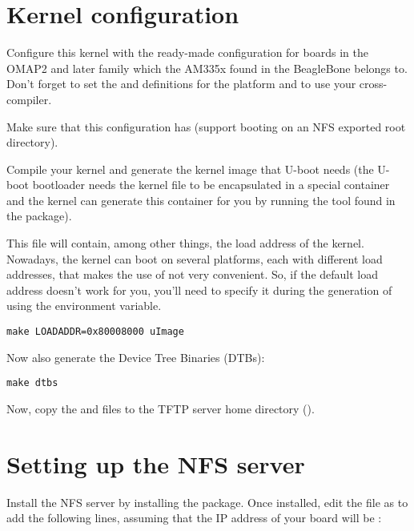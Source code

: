 \section{Kernel configuration}

Configure this kernel with the ready-made configuration for boards in
the OMAP2 and later family which the AM335x found in the BeagleBone
belongs to. Don't forget to set the  and
 definitions for the  platform and to
use your cross-compiler.

Make sure that this configuration has  (support
booting on an NFS exported root directory).

Compile your kernel and generate the  kernel image that
U-boot needs (the U-boot bootloader needs the kernel 
file to be encapsulated in a special container and the kernel
 can generate this container for you by running the
 tool found in the  package).

This file will contain, among other things, the load address of the
kernel. Nowadays, the kernel can boot on several platforms, each with
different load addresses, that makes the use of  not very
convenient. So, if the default load address doesn't work for you, you'll
need to specify it during the generation of  using the
 environment variable.

\begin{verbatim}
make LOADADDR=0x80008000 uImage
\end{verbatim}

Now also generate the Device Tree Binaries (DTBs):

\begin{verbatim}
make dtbs
\end{verbatim}

Now, copy the  and  files
to the TFTP server home directory ().

\section{Setting up the NFS server}

Install the NFS server by installing the 
package. Once installed, edit the  file as
 to add the following lines, assuming that the IP address
of your board will be :

